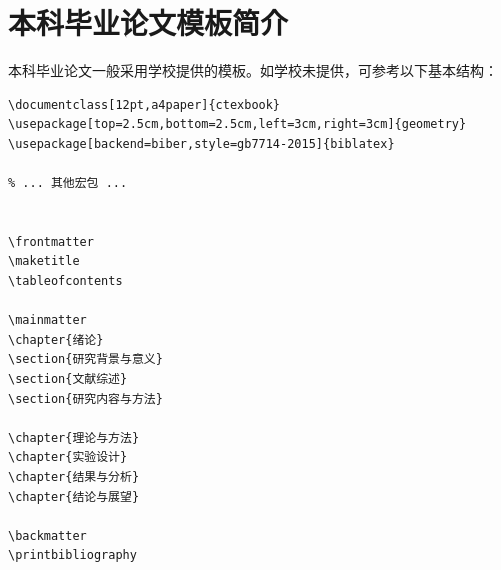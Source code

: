 \section{本科毕业论文模板简介}

本科毕业论文一般采用学校提供的模板。如学校未提供，可参考以下基本结构：

\begin{lstlisting}[style=html]
\documentclass[12pt,a4paper]{ctexbook}
\usepackage[top=2.5cm,bottom=2.5cm,left=3cm,right=3cm]{geometry}
\usepackage[backend=biber,style=gb7714-2015]{biblatex}

% ... 其他宏包 ...


\frontmatter
\maketitle
\tableofcontents

\mainmatter
\chapter{绪论}
\section{研究背景与意义}
\section{文献综述}
\section{研究内容与方法}

\chapter{理论与方法}
\chapter{实验设计}
\chapter{结果与分析}
\chapter{结论与展望}

\backmatter
\printbibliography

\end{lstlisting}

